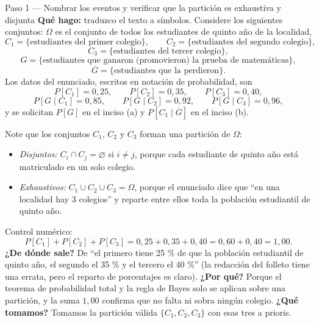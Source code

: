 \documentclass[11pt]{article}
\begin{document}
\begin{sol}

\begin{paso}{Paso 1 --- Nombrar los eventos y verificar que la partici\'on es exhaustiva y disjunta}
\textbf{Qu\'e hago:} traduzco el texto a s\'imbolos. Considere los siguientes conjuntos: $\Omega$ es el conjunto de todos los estudiantes de quinto a\~no de la localidad,
\[
C_1=\{\text{estudiantes del primer colegio}\},\qquad
C_2=\{\text{estudiantes del segundo colegio}\},
\]
\[
C_3=\{\text{estudiantes del tercer colegio}\},
\]
\[
G=\{\text{estudiantes que ganaron (promovieron) la prueba de matem\'aticas}\},
\]
\[
\overline{G}=\{\text{estudiantes que la perdieron}\}.
\]
Los datos del enunciado, escritos en notaci\'on de probabilidad, son
\[
P[C_1]=0{,}25,\qquad P[C_2]=0{,}35,\qquad P[C_3]=0{,}40 ,
\]
\[
P[G\mid C_1]=0{,}85,\qquad P[G\mid C_2]=0{,}92,\qquad P[G\mid C_3]=0{,}96 ,
\]
y se solicitan $P[G]$ en el inciso (a) y $P[C_1\mid\overline{G}]$ en el inciso (b).

\medskip
Note que los conjuntos $C_1$, $C_2$ y $C_3$ forman una partici\'on de $\Omega$:
\begin{itemize}[leftmargin=1.4em]
\item \emph{Disjuntos:} $C_i\cap C_j=\varnothing$ si $i\neq j$, porque cada estudiante de quinto a\~no est\'a matriculado en un solo colegio.
\item \emph{Exhaustivos:} $C_1\cup C_2\cup C_3=\Omega$, porque el enunciado dice que ``en una localidad hay 3 colegios'' y reparte entre ellos toda la poblaci\'on estudiantil de quinto a\~no.
\end{itemize}
Control num\'erico:
\[
P[C_1]+P[C_2]+P[C_3]=0{,}25+0{,}35+0{,}40=0{,}60+0{,}40=1{,}00 .
\]
\textbf{¿De d\'onde sale?} De ``el primero tiene 25 \% de que la poblaci\'on estudiantil de quinto a\~no, el segundo el 35 \% y el tercero el 40 \%'' (la redacci\'on del folleto tiene una errata, pero el reparto de porcentajes es claro).
\textbf{¿Por qu\'e?} Porque el teorema de probabilidad total y la regla de Bayes solo se aplican sobre una partici\'on, y la suma $1{,}00$ confirma que no falta ni sobra ning\'un colegio.
\textbf{¿Qu\'e tomamos?} Tomamos la partici\'on v\'alida $\{C_1,C_2,C_3\}$ con esas tres a prioris.
\end{paso}


\end{sol}
\end{document}
